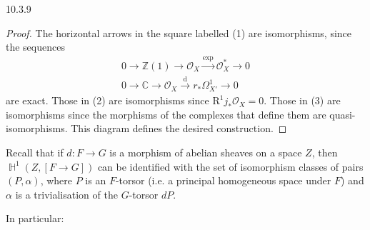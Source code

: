 \begin{construction}{10.3.9}
\begin{proof}
  \par{}The horizontal arrows in the square labelled (1) are isomorphisms, since the sequences
      \[         \begin {gathered}           0 \to  \mathbb {Z}(1) \to  \mathcal {O}_X \xrightarrow {\exp } \mathcal {O}_X^* \to  0         \\0 \to  \mathbb {C} \to  \mathcal {O}_X \xrightarrow {\mathrm {d}} r_*\Omega _{X'}^1 \to  0         \end {gathered}       \]
      are exact.
      Those in (2) are isomorphisms since \(\mathrm {R}^1j_*\mathcal {O}_X=0\).
      Those in (3) are isomorphisms since the morphisms of the complexes that define them are quasi-isomorphisms.
      This diagram defines the desired construction.\end{proof}\end{construction}\label{hodge-theory-iii-10.3.10}\par{}Recall that if \(d\colon  F\to  G\) is a morphism of abelian sheaves on a space \(Z\), then \(\operatorname {\mathbb {H}}^1(Z,[F\to  G])\) can be identified with the set of isomorphism classes of pairs \((P,\alpha )\), where \(P\) is an \(F\)-torsor (i.e. a principal homogeneous space under \(F\)) and \(\alpha \) is a trivialisation of the \(G\)-torsor \(dP\).\par{}In particular:

